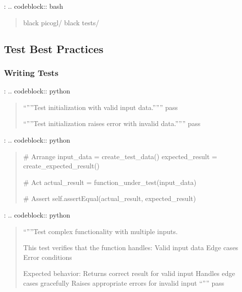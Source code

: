 \documentclass[a4paper,10pt,english,openany,oneside]{sphinxmanual}
\begin{document}
\sphinxAtStartPar
{}:
.. code\sphinxhyphen{}block:: bash
\begin{quote}

\sphinxAtStartPar
black picogl/
black tests/
\end{quote}


\subsection{Test Best Practices}
\label{\detokenize{testing:test-best-practices}}

\subsubsection{Writing Tests}
\label{\detokenize{testing:writing-tests}}
\sphinxAtStartPar
{}:
.. code\sphinxhyphen{}block:: python
\begin{quote}
\begin{description}
\sphinxAtStartPar
“””Test initialization with valid input data.”””
pass

\sphinxAtStartPar
“””Test initialization raises error with invalid data.”””
pass

\end{description}
\end{quote}

\sphinxAtStartPar
{}:
.. code\sphinxhyphen{}block:: python
\begin{quote}
\begin{description}
\sphinxAtStartPar
\# Arrange
input\_data = create\_test\_data()
expected\_result = create\_expected\_result()

\sphinxAtStartPar
\# Act
actual\_result = function\_under\_test(input\_data)

\sphinxAtStartPar
\# Assert
self.assertEqual(actual\_result, expected\_result)

\end{description}
\end{quote}

\sphinxAtStartPar
{}:
.. code\sphinxhyphen{}block:: python
\begin{quote}
\begin{description}
\sphinxAtStartPar
“””Test complex functionality with multiple inputs.

\sphinxAtStartPar
This test verifies that the function handles:
\sphinxhyphen{} Valid input data
\sphinxhyphen{} Edge cases
\sphinxhyphen{} Error conditions

\sphinxAtStartPar
Expected behavior:
\sphinxhyphen{} Returns correct result for valid input
\sphinxhyphen{} Handles edge cases gracefully
\sphinxhyphen{} Raises appropriate errors for invalid input
“””
pass

\end{description}
\end{quote}
\end{document}

